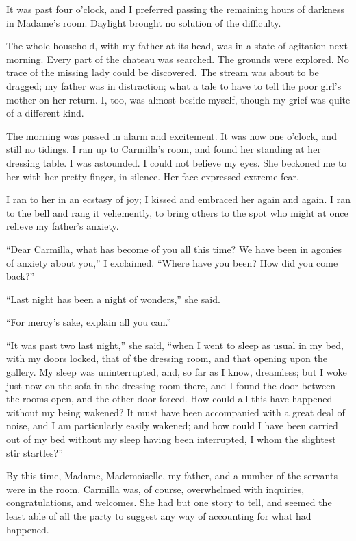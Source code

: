 \documentclass[11pt,twoside,makeidx,hidelinks,]{memoir}
\begin{document}
It was past four o'clock, and I preferred passing the remaining hours of
darkness in Madame's room. Daylight brought no solution of the
difficulty.

The whole household, with my father at its head, was in a state of
agitation next morning. Every part of the chateau was searched. The
grounds were explored. No trace of the missing lady could be discovered.
The stream was about to be dragged; my father was in distraction; what a
tale to have to tell the poor girl's mother on her return. I, too, was
almost beside myself, though my grief was quite of a different kind.

The morning was passed in alarm and excitement. It was now one o'clock,
and still no tidings. I ran up to Carmilla's room, and found her
standing at her dressing table. I was astounded. I could not believe my
eyes. She beckoned me to her with her pretty finger, in silence. Her
face expressed extreme fear.

I ran to her in an ecstasy of joy; I kissed and embraced her again and
again. I ran to the bell and rang it vehemently, to bring others to the
spot who might at once relieve my father's anxiety.

``Dear Carmilla, what has become of you all this time? We have been in
agonies of anxiety about you,'' I exclaimed. ``Where have you been? How
did you come back?''

``Last night has been a night of wonders,'' she said.

``For mercy's sake, explain all you can.''

``It was past two last night,'' she said, ``when I went to sleep as usual
in my bed, with my doors locked, that of the dressing room, and that
opening upon the gallery. My sleep was uninterrupted, and, so far as I
know, dreamless; but I woke just now on the sofa in the dressing room
there, and I found the door between the rooms open, and the other door
forced. How could all this have happened without my being wakened? It
must have been accompanied with a great deal of noise, and I am
particularly easily wakened; and how could I have been carried out of my
bed without my sleep having been interrupted, I whom the slightest stir
startles?''

By this time, Madame, Mademoiselle, my father, and a number of the
servants were in the room. Carmilla was, of course, overwhelmed with
inquiries, congratulations, and welcomes. She had but one story to tell,
and seemed the least able of all the party to suggest any way of
accounting for what had happened.
\end{document}
